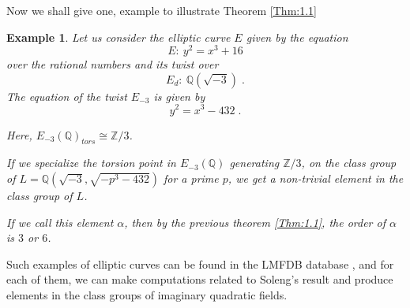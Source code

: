 \documentclass[12pt, 14paper]{amsart}
\theoremstyle{plain}
\newtheorem{example}[subsection]{Example}
\numberwithin{equation}{section}
\newcommand \ZZ {{\mathbb Z}}
\newcommand \QQ {{\mathbb Q}}
\begin{document}
Now we shall give one, example to illustrate Theorem \eqref{Thm:1.1}



    
\begin{example}
Let us consider the elliptic curve $E$ given by the equation 
$$E :~ y^2=x^3 + 16$$
over the rational numbers and its twist over 
$$E_d: ~ \QQ(\sqrt{-3})\;.$$
The equation of the twist $E_{-3}$ is given by 
$$y^2=x^3-432\;.$$

Here, $E_{-3}(\mathbb{Q})_{tors} \cong \mathbb{Z}/3$.

 If we specialize the torsion point in $E_{-3}(\QQ)$ generating $\ZZ/3$, on the class group of $L=\QQ(\sqrt{-3}, \sqrt{-p^3-432})$ for a prime $p$,  we get a non-trivial element in the class group of $L$.

 If we call this element $\alpha$, then by the previous theorem \eqref{Thm:1.1}, the order of $\alpha$ is $3$ or $6$.
 
\end{example}


Such examples of elliptic curves can be found in the LMFDB database \cite{LMFDB}, and for each of them, we can make computations related to Soleng's result and produce elements in the class groups of imaginary quadratic fields.




    
\end{document}
